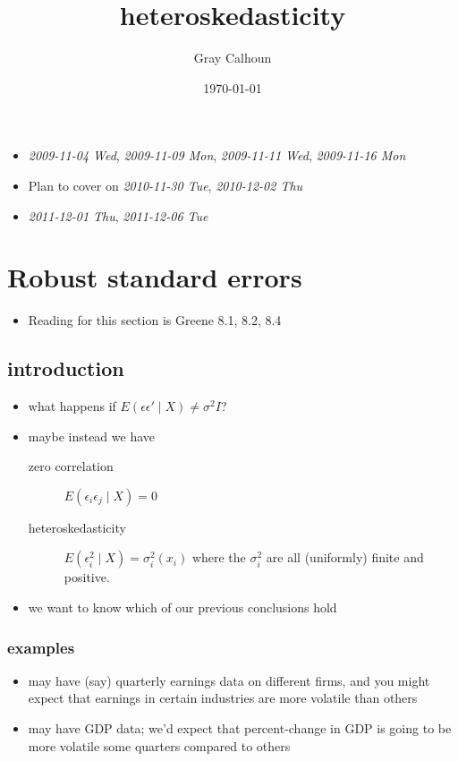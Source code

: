 \documentclass[11pt]{article}
\title{heteroskedasticity}
\author{Gray Calhoun}
\date{\today}
\begin{document}
\maketitle

\setcounter{tocdepth}{2}
\tableofcontents
\vspace*{1cm}
\begin{itemize}
\item \textit{2009-11-04 Wed}, \textit{2009-11-09 Mon},  \textit{2009-11-11 Wed}, \textit{2009-11-16 Mon}
\item Plan to cover on \textit{2010-11-30 Tue}, \textit{2010-12-02 Thu}
\item \textit{2011-12-01 Thu}, \textit{2011-12-06 Tue}
\end{itemize}
\section{Robust standard errors}
\label{sec-1}

\begin{itemize}
\item Reading for this section is Greene 8.1, 8.2, 8.4
\end{itemize}
\subsection{introduction}
\label{sec-1-1}

\begin{itemize}
\item what happens if $E(\epsilon \epsilon' \mid X) \neq \sigma^2 I$?
\item maybe instead we have
\begin{description}
\item[zero correlation] $E(\epsilon_i \epsilon_j \mid X) = 0$
\item[heteroskedasticity] $E(\epsilon_i^2 \mid X) =
            \sigma_i^2(x_i)$ where the $\sigma_i^2$ are all
            (uniformly) finite and positive.
\end{description}
\item we want to know which of our previous conclusions hold
\end{itemize}
\subsubsection{examples}
\label{sec-1-1-1}

\begin{itemize}
\item may have (say) quarterly earnings data on different firms, and
        you might expect that earnings in certain industries are more
        volatile than others
\item may have GDP data; we'd expect that percent-change in GDP is
        going to be more volatile some quarters compared to others
\end{itemize}
\end{document}
